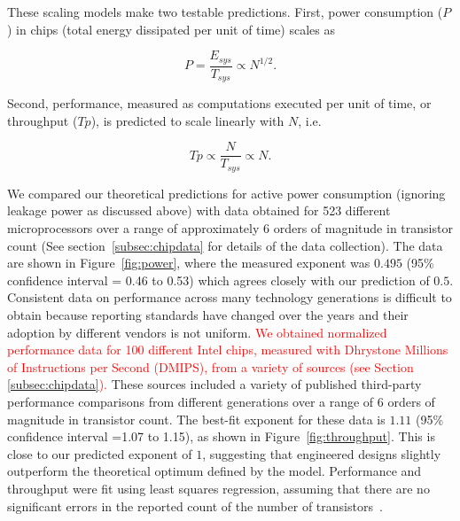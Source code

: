 \documentclass[12pt]{article}
\newcommand{\red}[1]{\textcolor{red}{#1}}
\begin{document}
These scaling models make two testable predictions.  First, power
consumption ($P$) in chips (total energy dissipated per unit of time) scales as

\begin{equation}
\label{eq:Power}
P = \frac{E_{sys}}{T_{sys}} \propto N^{1/2} .
\end{equation}
 
\noindent Second, performance,
measured as computations executed per unit of time, or throughput ($Tp$), is predicted
to scale linearly with $N$,  i.e.  

\begin{equation}
\label{eq:Performance}
Tp\propto \frac{N}{T_{sys}} \propto N .
\end{equation}

We compared our theoretical predictions for active power consumption (ignoring leakage power as discussed above) with data
obtained for 523 different microprocessors over a range of approximately 6
orders of magnitude in transistor count (See section~\ref{subsec:chipdata} for
details of the data collection).  The data are shown in
Figure~\ref{fig:power}, where the measured exponent was $0.495$ (95\%
confidence interval = 0.46 to 0.53) which agrees closely with our prediction of
$0.5$. Consistent data on performance across many technology generations is
difficult to obtain because reporting standards have changed over the years and
their adoption by different vendors is not uniform.  \red{We obtained
normalized performance data for 100 different Intel chips, measured
with \red{Dhrystone} Millions of Instructions per Second (DMIPS), from
a variety of sources (see Section \ref{subsec:chipdata}).} These sources included
a variety of published third-party performance comparisons from different
generations over a range of 6 orders of magnitude in transistor count.  The
best-fit exponent for these data is $1.11$ (95\% confidence interval =1.07 to
1.15), as shown in Figure~\ref{fig:throughput}. This is close to our
predicted exponent of $1$, suggesting that engineered designs slightly
outperform the theoretical optimum defined by the model. Performance and throughput were fit
using least squares regression, assuming that there
are no significant errors in the reported count of the number of transistors~\cite{mcardle1988structural}.  
\end{document}
